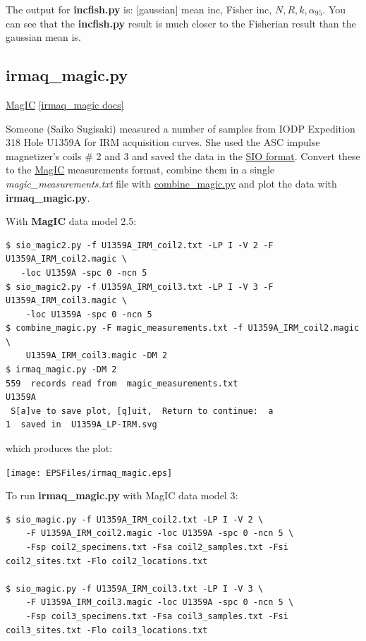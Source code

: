 \documentclass[11pt]{book}
\begin{document}
{{{{The output for {\bf incfish.py} is:  [gaussian] mean inc, Fisher inc, $N, R, k, \alpha_{95}$.  You can see that the {\bf incfish.py} result is much closer to the Fisherian result than the gaussian mean is.

\subsection{irmaq\_magic.py}
\href{#MagIC}{MagIC}
\href{https://github.com/PmagPy/PmagPy/blob/master/programs/irmaq_magic.py}{[irmaq\_magic docs]}

Someone (Saiko Sugisaki) measured a number of samples from IODP Expedition 318 Hole U1359A for IRM acquisition curves.  She used the ASC impulse magnetizer's coils \# 2 and 3 and saved the data in the \href{#sio_magic.py}{SIO format}.   Convert these to the \href{#MagIC}{MagIC} measurements  format, combine them in a  single {\it magic\_measurements.txt} file with \href{#combine_magic.py}{combine\_magic.py} and plot the data with {\bf irmaq\_magic.py}.

With {\bf MagIC} data model 2.5:

\begin{verbatim}
$ sio_magic2.py -f U1359A_IRM_coil2.txt -LP I -V 2 -F U1359A_IRM_coil2.magic \
   -loc U1359A -spc 0 -ncn 5
$ sio_magic2.py -f U1359A_IRM_coil3.txt -LP I -V 3 -F U1359A_IRM_coil3.magic \
    -loc U1359A -spc 0 -ncn 5
$ combine_magic.py -F magic_measurements.txt -f U1359A_IRM_coil2.magic \
    U1359A_IRM_coil3.magic -DM 2
$ irmaq_magic.py -DM 2
559  records read from  magic_measurements.txt
U1359A
 S[a]ve to save plot, [q]uit,  Return to continue:  a
1  saved in  U1359A_LP-IRM.svg
\end{verbatim}

which produces the plot:

\texttt{[image: EPSFiles/irmaq\_magic.eps]}

To run {\bf irmaq\_magic.py} with MagIC data model 3:

\begin{verbatim}
$ sio_magic.py -f U1359A_IRM_coil2.txt -LP I -V 2 \
    -F U1359A_IRM_coil2.magic -loc U1359A -spc 0 -ncn 5 \
    -Fsp coil2_specimens.txt -Fsa coil2_samples.txt -Fsi coil2_sites.txt -Flo coil2_locations.txt

$ sio_magic.py -f U1359A_IRM_coil3.txt -LP I -V 3 \
    -F U1359A_IRM_coil3.magic -loc U1359A -spc 0 -ncn 5 \
    -Fsp coil3_specimens.txt -Fsa coil3_samples.txt -Fsi coil3_sites.txt -Flo coil3_locations.txt


\end{verbatim}}}}}
\end{document}
